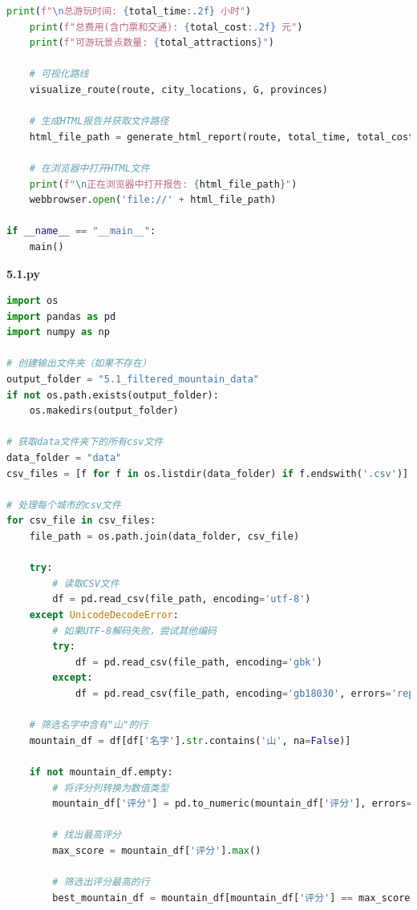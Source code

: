 \documentclass[withoutpreface,bwprint]{cumcmthesis} %
\begin{document}
\begin{appendices}
\begin{lstlisting}[language=python]
    print(f"\n总游玩时间: {total_time:.2f} 小时")
    print(f"总费用(含门票和交通): {total_cost:.2f} 元")
    print(f"可游玩景点数量: {total_attractions}")
    
    # 可视化路线
    visualize_route(route, city_locations, G, provinces)
    
    # 生成HTML报告并获取文件路径
    html_file_path = generate_html_report(route, total_time, total_cost, total_attractions, G, top_cities, guangzhou_attractions)
    
    # 在浏览器中打开HTML文件
    print(f"\n正在浏览器中打开报告: {html_file_path}")
    webbrowser.open('file://' + html_file_path)

if __name__ == "__main__":
    main()

 \end{lstlisting}








 \textbf{5.1.py}
\begin{lstlisting}[language=python]
import os
import pandas as pd
import numpy as np

# 创建输出文件夹（如果不存在）
output_folder = "5.1_filtered_mountain_data"
if not os.path.exists(output_folder):
    os.makedirs(output_folder)

# 获取data文件夹下的所有csv文件
data_folder = "data"
csv_files = [f for f in os.listdir(data_folder) if f.endswith('.csv')]

# 处理每个城市的csv文件
for csv_file in csv_files:
    file_path = os.path.join(data_folder, csv_file)
    
    try:
        # 读取CSV文件
        df = pd.read_csv(file_path, encoding='utf-8')
    except UnicodeDecodeError:
        # 如果UTF-8解码失败，尝试其他编码
        try:
            df = pd.read_csv(file_path, encoding='gbk')
        except:
            df = pd.read_csv(file_path, encoding='gb18030', errors='replace')
    
    # 筛选名字中含有"山"的行
    mountain_df = df[df['名字'].str.contains('山', na=False)]
    
    if not mountain_df.empty:
        # 将评分列转换为数值类型
        mountain_df['评分'] = pd.to_numeric(mountain_df['评分'], errors='coerce')
        
        # 找出最高评分
        max_score = mountain_df['评分'].max()
        
        # 筛选出评分最高的行
        best_mountain_df = mountain_df[mountain_df['评分'] == max_score]
        

\end{lstlisting}
\end{appendices}
\end{document}
